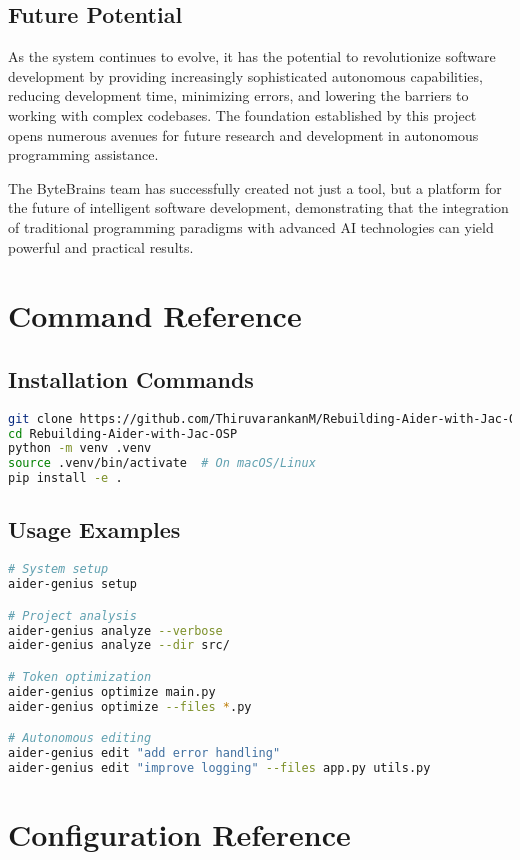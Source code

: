 \documentclass[12pt,a4paper]{article}
\begin{document}
\subsection{Future Potential}
As the system continues to evolve, it has the potential to revolutionize software development by providing increasingly sophisticated autonomous capabilities, reducing development time, minimizing errors, and lowering the barriers to working with complex codebases. The foundation established by this project opens numerous avenues for future research and development in autonomous programming assistance.

The ByteBrains team has successfully created not just a tool, but a platform for the future of intelligent software development, demonstrating that the integration of traditional programming paradigms with advanced AI technologies can yield powerful and practical results.

\appendix

\section{Command Reference}

\subsection{Installation Commands}
\begin{lstlisting}[language=bash]
git clone https://github.com/ThiruvarankanM/Rebuilding-Aider-with-Jac-OSP.git
cd Rebuilding-Aider-with-Jac-OSP
python -m venv .venv
source .venv/bin/activate  # On macOS/Linux
pip install -e .
\end{lstlisting}

\subsection{Usage Examples}
\begin{lstlisting}[language=bash]
# System setup
aider-genius setup

# Project analysis
aider-genius analyze --verbose
aider-genius analyze --dir src/

# Token optimization
aider-genius optimize main.py
aider-genius optimize --files *.py

# Autonomous editing
aider-genius edit "add error handling"
aider-genius edit "improve logging" --files app.py utils.py
\end{lstlisting}

\section{Configuration Reference}
\end{document}
